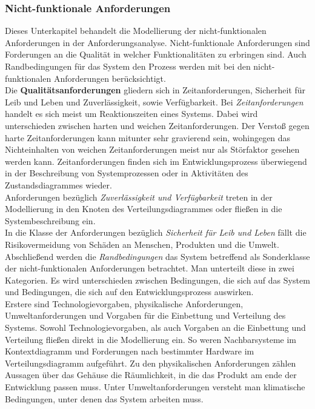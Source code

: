 \documentclass[../Bachelorarbeit.tex]{subfiles}
\begin{document}
\subsubsection{Nicht-funktionale Anforderungen}
Dieses Unterkapitel behandelt die Modellierung der nicht-funktionalen Anforderungen in der Anforderungsanalyse. Nicht-funktionale Anforderungen sind Forderungen an die Qualität in welcher Funktionalitäten zu erbringen sind. Auch Randbedingungen für das System \bzw den Prozess werden mit bei den nicht-funktionalen Anforderungen berücksichtigt.\\ %
Die \textbf{Qualitätsanforderungen} gliedern sich in Zeitanforderungen, Sicherheit für Leib und Leben und Zuverlässigkeit, sowie Verfügbarkeit. Bei \textit{Zeitanforderungen} handelt es sich meist um Reaktionszeiten eines Systems. Dabei wird unterschieden zwischen harten und weichen Zeitanforderungen. Der Verstoß gegen harte Zeitanforderungen kann mitunter sehr gravierend sein, wohingegen das Nichteinhalten von weichen Zeitanforderungen meist nur als Störfaktor gesehen werden kann. Zeitanforderungen finden sich im Entwicklungsprozess überwiegend in der Beschreibung von Systemprozessen oder in Aktivitäten des Zustandsdiagrammes wieder.\\
Anforderungen bezüglich \textit{Zuverlässigkeit und Verfügbarkeit} treten in der Modellierung in den Knoten des Verteilungsdiagrammes oder fließen in die Systembeschreibung ein.\\
In die Klasse der Anforderungen bezüglich \textit{Sicherheit für Leib und Leben} fällt die Risikovermeidung von Schäden an Menschen, Produkten und die Umwelt.\\
Abschließend werden die \textit{Randbedingungen} das System betreffend als Sonderklasse der nicht-funktionalen Anforderungen betrachtet. Man unterteilt diese in zwei Kategorien. Es wird unterschieden zwischen Bedingungen, die sich auf das System und Bedingungen, die sich auf den Entwicklungsprozess auswirken.\\
Erstere sind Technologievorgaben, physikalische Anforderungen, Umweltanforderungen und Vorgaben für die Einbettung und Verteilung des Systems. Sowohl Technologievorgaben, als auch Vorgaben an die Einbettung und Verteilung fließen direkt in die Modellierung ein. So weren \bspw Nachbarsysteme im Kontextdiagramm und Forderungen nach bestimmter Hardware im Verteilungsdiagramm aufgeführt. Zu den physikalischen Anforderungen zählen \zB Aussagen über das Gehäuse \bzw die Räumlichkeit, in die das Produkt am ende der Entwicklung passen muss. Unter Umweltanforderungen versteht man \bspw klimatische Bedingungen, unter denen das System arbeiten muss.\\
\end{document}
